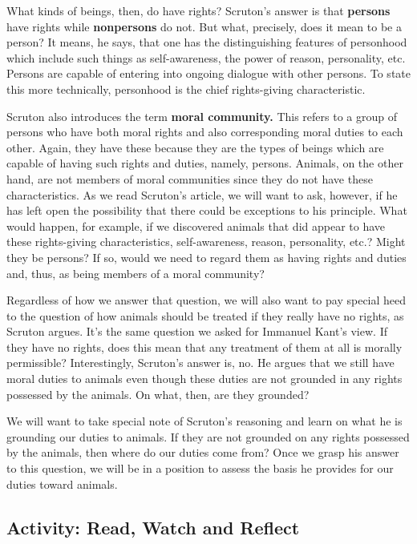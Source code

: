 \documentclass[
]{book}
\begin{document}
What kinds of beings, then, do have rights? Scruton's answer is that \textbf{persons} have rights while \textbf{nonpersons} do not. But what, precisely, does it mean to be a person? It means, he says, that one has the distinguishing features of personhood which include such things as self-awareness, the power of reason, personality, etc. Persons are capable of entering into ongoing dialogue with other persons. To state this more technically, personhood is the chief rights-giving characteristic.

Scruton also introduces the term \textbf{moral community.} This refers to a group of persons who have both moral rights and also corresponding moral duties to each other. Again, they have these because they are the types of beings which are capable of having such rights and duties, namely, persons. Animals, on the other hand, are not members of moral communities since they do not have these characteristics.
As we read Scruton's article, we will want to ask, however, if he has left open the possibility that there could be exceptions to his principle. What would happen, for example, if we discovered animals that did appear to have these rights-giving characteristics, self-awareness, reason, personality, etc.? Might they be persons? If so, would we need to regard them as having rights and duties and, thus, as being members of a moral community?

Regardless of how we answer that question, we will also want to pay special heed to the question of how animals should be treated if they really have no rights, as Scruton argues. It's the same question we asked for Immanuel Kant's view. If they have no rights, does this mean that any treatment of them at all is morally permissible? Interestingly, Scruton's answer is, no. He argues that we still have moral duties to animals even though these duties are not grounded in any rights possessed by the animals. On what, then, are they grounded?

We will want to take special note of Scruton's reasoning and learn on what he is grounding our duties to animals. If they are not grounded on any rights possessed by the animals, then where do our duties come from? Once we grasp his answer to this question, we will be in a position to assess the basis he provides for our duties toward animals.

\hypertarget{activity-read-watch-and-reflect-11}{%
\subsection*{Activity: Read, Watch and Reflect}\label{activity-read-watch-and-reflect-11}}
\end{document}
